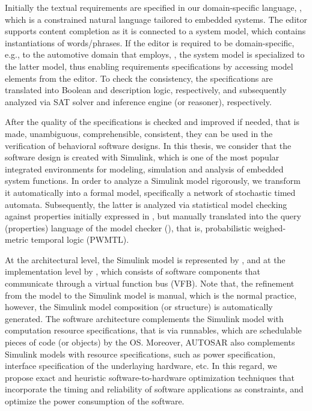Initially the textual requirements are specified in our domain-specific language, \resa, which is a constrained natural language tailored to embedded systems. The \resa{} editor supports content completion as it is connected to a system model, which contains instantiations of words/phrases. If the \resa{} editor is required to be domain-specific, e.g., to the automotive domain that employs, \eastadl, the system model is specialized to the latter model, thus enabling requirements specifications by accessing \eastadl{} model elements from the editor. To check the consistency, the \resa{} specifications are translated into Boolean and description logic, respectively, and subsequently analyzed via SAT solver and inference engine (or reasoner), respectively.

After the quality of the specifications is checked and improved if needed, that is made, unambiguous, comprehensible, consistent, they can be used in the verification of behavioral software designs. In this thesis, we consider that the software design is created with Simulink, which is one of the most popular integrated environments for modeling, simulation and analysis of embedded system functions. In order to analyze a Simulink model rigorously, we transform it automatically into a formal model, specifically a network of stochastic timed automata. Subsequently, the latter is analyzed via statistical model checking against properties initially expressed in \resa, but manually translated into the query (properties) language of the model checker (\uppaalsmc), that is,  probabilistic weighed-metric temporal logic (PWMTL).

At the architectural level, the Simulink model is represented by \eastadl{}, and at the implementation level by \autosar{}, which consists of software components that communicate through a virtual function bus (VFB).  Note that, the refinement from the \autosar{} model to the Simulink model is manual, which is the normal practice, however, the Simulink model composition (or structure) is automatically generated. The software architecture complements the Simulink model with computation resource specifications, that is via runnables, which are schedulable pieces of code (or objects) by the \autosar{} OS. Moreover, AUTOSAR also complements Simulink models with resource specifications, such as power specification, interface specification of the underlaying hardware, etc. In this regard, we propose exact and heuristic software-to-hardware optimization techniques that incorporate the timing and reliability of software applications as constraints, and optimize the power consumption of the software.

